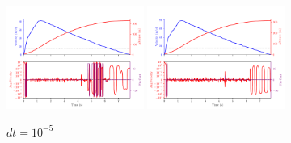 \documentclass{amsdtx}
\begin{document}
\begin{figure}[H]
\centering
\includegraphics[width=0.4\textwidth]{bib/figures_for_readme/RK4_dt_0p00001.pdf}
\includegraphics[width=0.4\textwidth]{bib/figures_for_readme/RK6_dt_0p00001.pdf}
\caption{$dt=10^{-5}$}
\end{figure}
\end{document}
